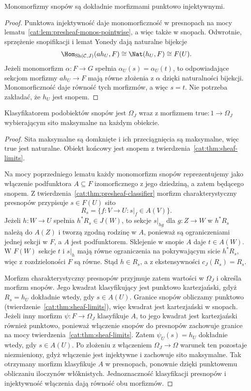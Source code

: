 \begin{lemat}\label{cat:lem:sheaf-monos-pointwise}
Monomorfizmy snopów są dokładnie morfizmami punktowo injektywnymi.
\end{lemat}
\begin{proof}
Punktowa injektywność daje monomorficzność w presnopach na mocy lematu~\ref{cat:lem:presheaf-monos-pointwise}, a więc także w snopach. Odwrotnie, sprzężenie snopifikacji i lemat Yonedy dają naturalne bijekcje
\[
 \Hom_{\operatorname{Sh}(\mathcal C,J)}(a h_U,F)
 \cong\Nat(h_U,F)\cong F(U).
\]
Jeżeli monomorfizm $\alpha:F\to G$ spełnia $\alpha_U(s)=\alpha_U(t)$, to odpowiadające sekcjom morfizmy $a h_U\to F$ mają równe złożenia z $\alpha$ dzięki naturalności bijekcji. Monomorficzność daje równość tych morfizmów, a więc $s=t$. Nie potrzeba zakładać, że $h_U$ jest snopem.
\end{proof}

\begin{twierdzenie}\label{cat:thm:sheaf-classifier}
Klasyfikatorem podobiektów snopów jest $\Omega_J$ wraz z morfizmem $\mathrm{true}:1\to\Omega_J$ wybierającym sito maksymalne na każdym obiekcie.
\end{twierdzenie}
\begin{proof}
Sita maksymalne są domknięte i ich przeciągnięcia są maksymalne, więc $\mathrm{true}$ jest naturalne. Obiekt końcowy jest snopem z twierdzenia~\ref{cat:thm:sheaf-limits}.

Na mocy poprzedniego lematu każdy monomorfizm snopów reprezentujemy jako włączenie podfunktora $A\subseteq F$ izomorficznego z jego dziedziną, a zatem będącego snopem. Z twierdzenia~\ref{cat:thm:presheaf-classifier} morfizm charakterystyczny presnopów przypisuje $s\in F(U)$ sito
\[
 R_s=\{f:V\to U:s|_f\in A(V)\}.
\]
Jeżeli $h:W\to U$ spełnia $h^*R_s\in J(W)$, to sekcje $s|_{hg}$ dla $g:Z\to W$ w $h^*R_s$ należą do $A(Z)$ i tworzą zgodną rodzinę w $A$, ponieważ są ograniczeniami jednej sekcji w $F$, a $A$ jest podfunktorem. Sklejenie w snopie $A$ daje $t\in A(W)$. W $F(W)$ sekcje $t$ i $s|_h$ mają równe ograniczenia na pokrywającym sicie $h^*R_s$, więc z rozdzieloności $F$ są równe. Stąd $h\in R_s$, a z ekstensywności $c_J(R_s)=R_s$.

Morfizm charakterystyczny presnopów przyjmuje zatem wartości w $\Omega_J$ i określa morfizm snopów. Jego kwadrat klasyfikujący jest punktowo kartezjański, gdyż $R_s=h_U$ dokładnie wtedy, gdy $s\in A(U)$. Granice snopów obliczamy punktowo (twierdzenie~\ref{cat:thm:sheaf-limits}), więc kwadrat jest kartezjański w snopach. Jeżeli inny morfizm $\psi:F\to\Omega_J$ klasyfikuje $A$, to jego kwadrat jest kartezjański również punktowo, ponieważ włączenie snopów do presnopów zachowuje granice na mocy twierdzenia~\ref{cat:thm:sheaf-limits}. Zatem $\psi_U(s)=h_U$ dokładnie wtedy, gdy $s\in A(U)$. Po złożeniu z włączeniem $\Omega_J\to\Omega$ warunek ten pozostaje niezmieniony, gdyż włączenie jest injektywne i zachowuje sito maksymalne. Tak otrzymany morfizm klasyfikuje $A$ w presnopach, ponownie dzięki punktowemu obliczaniu iloczynów włóknistych. Jednoznaczność klasyfikacji presnopów i injektywność włączenia dają równość obu morfizmów.
\end{proof}

